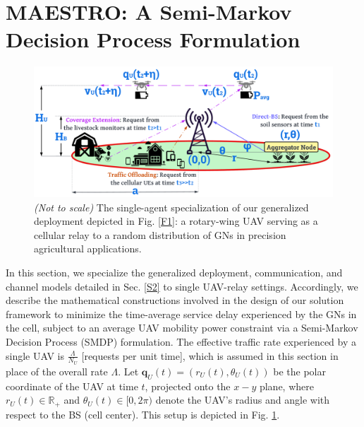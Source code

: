 \documentclass[12pt, draftcls, onecolumn]{IEEEtran}
\theoremstyle{plain}
\theoremstyle{definition}
\theoremstyle{remark}
\begin{document}
\section{MAESTRO: A Semi-Markov Decision Process Formulation}\label{S3}
\vspace{-2mm}

\begin{figure} [t]
    \centering
    \includegraphics[width=0.9\linewidth]{figs/Single_Agent_Specialization.png}
    \caption{\emph{(Not to scale)} The single-agent specialization of our generalized deployment depicted in Fig. \ref{F1}: a rotary-wing UAV serving as a cellular relay to a random distribution of GNs in precision agricultural applications.}
    \vspace{-10mm}
    \label{F4}
\end{figure}

In this section, we specialize the generalized deployment, communication, and channel models detailed in Sec. \ref{S2} to single UAV-relay settings. Accordingly, we describe the mathematical constructions involved in the design of our solution framework to minimize the time-average service delay experienced by the GNs in the cell, subject to an average UAV mobility power constraint via a Semi-Markov Decision Process (SMDP) formulation. The effective traffic rate experienced by a single UAV is $\frac{\Lambda}{N_U}$ [requests per unit time], which is assumed in this section in place of the overall rate $\Lambda$. Let $\mathbf{q}_{U}(t){=}(r_{U}(t),\theta_{U}(t))$ be the polar coordinate of the UAV at time $t$, projected onto the $x{-}y$ plane, where $r_{U}(t){\in}\mathbb{R}_{+}$ and $\theta_{U}(t){\in}[0,2\pi)$ denote the UAV's radius and angle with respect to the BS (cell center). This setup is depicted in Fig. \ref{F4}.
\end{document}
